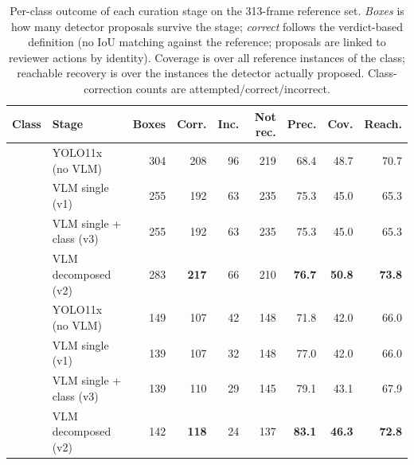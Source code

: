 \begin{table}[t]
\centering
\caption{Per-class outcome of each curation stage on the 313-frame reference
set. \emph{Boxes} is how many detector proposals survive the stage;
\emph{correct} follows the verdict-based definition (no IoU matching against the
reference; proposals are linked to reviewer actions by identity). Coverage is
over all reference instances of the class; reachable recovery is over the
instances the detector actually proposed. Class-correction counts are
attempted/correct/incorrect.}
\label{tab:cartruck}
\small
\setlength{\tabcolsep}{4pt}
\begin{tabular}{llrrrrrrr}
\toprule
Class & Stage & Boxes & Corr. & Inc. & Not rec. & Prec. & Cov. & Reach. \\
\midrule
{}
 & YOLO11x (no VLM)          & 304 & 208 & 96 & 219 & 68.4 & 48.7 & 70.7 \\
 & VLM single (v1)           & 255 & 192 & 63 & 235 & 75.3 & 45.0 & 65.3 \\
 & VLM single + class (v3)   & 255 & 192 & 63 & 235 & 75.3 & 45.0 & 65.3 \\
 & VLM decomposed (v2)       & 283 & \textbf{217} & 66 & 210 & \textbf{76.7} & \textbf{50.8} & \textbf{73.8} \\
\midrule
{}
 & YOLO11x (no VLM)          & 149 & 107 & 42 & 148 & 71.8 & 42.0 & 66.0 \\
 & VLM single (v1)           & 139 & 107 & 32 & 148 & 77.0 & 42.0 & 66.0 \\
 & VLM single + class (v3)   & 139 & 110 & 29 & 145 & 79.1 & 43.1 & 67.9 \\
 & VLM decomposed (v2)       & 142 & \textbf{118} & 24 & 137 & \textbf{83.1} & \textbf{46.3} & \textbf{72.8} \\
\bottomrule
\end{tabular}
\end{table}

